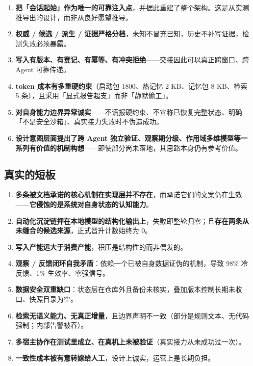\documentclass[11pt,a4paper]{ctexart}
\begin{document}
\begin{enumerate}
  \item \textbf{把「会话起始」作为唯一的可靠注入点}，并据此重建了整个架构。这是从实测推导出的设计，而非从良好愿望推导。
  \item \textbf{权威 / 候选 / 派生 / 证据严格分档}，未知不冒充已知，历史不补写证据，检测失败必须暴露。
  \item \textbf{写入有版本、有登记、有幂等、有冲突拒绝}——交接因此可以真正跨窗口、跨 Agent 可靠传递。
  \item \textbf{token 成本有多重硬约束}（启动包 1800、热记忆 2 KB、记忆包 8 KB、检索 5 条），且采用「显式报告超支」而非「静默偷工」。
  \item \textbf{对自身能力边界异常诚实}——不谎报硬约束、不宣称已恢复完整状态、明确「不是安全沙箱」、真实接力失败时不伪造成功。
  \item \textbf{设计意图层面提出了跨 Agent 独立验证、观察期分级、作用域多维模型等一系列有价值的机制构想}——即使部分尚未落地，其思路本身仍有参考价值。
\end{enumerate}

\subsection{真实的短板}

\begin{enumerate}
  \item \textbf{多条被文档承诺的核心机制在实现层并不存在}，而承诺它们的文案仍在生效——\textbf{它侵蚀的是系统对自身状态的认知能力}。
  \item \textbf{自动化沉淀链押在本地模型的结构化输出上}，失败即整轮归零；且\textbf{存在两条从未缝合的候选来源}，正式晋升计数始终为 0。
  \item \textbf{写入产能远大于消费产能}，积压是结构性的而非偶发的。
  \item \textbf{观察 / 反馈闭环自我矛盾}：依赖一个已被自身数据证伪的机制，导致 98\% 冷反馈、1\% 生效率、零强信号。
  \item \textbf{数据安全双重缺口}：状态层在仓库外且备份未核实，叠加版本控制长期未收口、快照目录为空。
  \item \textbf{检索无语义能力、无真正增量}，且边界声明不一致（部分是规则文本、无代码强制；内部告警被吞）。
  \item \textbf{多宿主协作在测试里成立、在真机上未被验证}（真实接力从未成功过一次）。
  \item \textbf{一致性成本被有意转嫁给人工}，设计上诚实，运营上是长期负担。
\end{enumerate}
\end{document}
